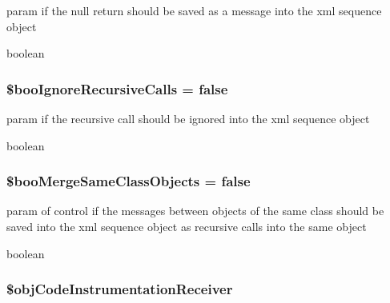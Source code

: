 param if the null return should be saved as a message into the xml sequence object

boolean \hypertarget{class_code_instrumentation_receiver_c97438486aabbfa4ee0880dfa95da884}{
\subsubsection[{\$booIgnoreRecursiveCalls}]{\setlength{\rightskip}{0pt plus 5cm}\$booIgnoreRecursiveCalls = false}}
\label{class_code_instrumentation_receiver_c97438486aabbfa4ee0880dfa95da884}


param if the recursive call should be ignored into the xml sequence object

boolean \hypertarget{class_code_instrumentation_receiver_d18203b561cb77792a5496f02e024874}{
\subsubsection[{\$booMergeSameClassObjects}]{\setlength{\rightskip}{0pt plus 5cm}\$booMergeSameClassObjects = false}}
\label{class_code_instrumentation_receiver_d18203b561cb77792a5496f02e024874}


param of control if the messages between objects of the same class should be saved into the xml sequence object as recursive calls into the same object

boolean \hypertarget{class_code_instrumentation_receiver_aab882095da061a56ed923f40497d878}{
\subsubsection[{\$objCodeInstrumentationReceiver}]{\setlength{\rightskip}{0pt plus 5cm}\$objCodeInstrumentationReceiver}}
\label{class_code_instrumentation_receiver_aab882095da061a56ed923f40497d878}


